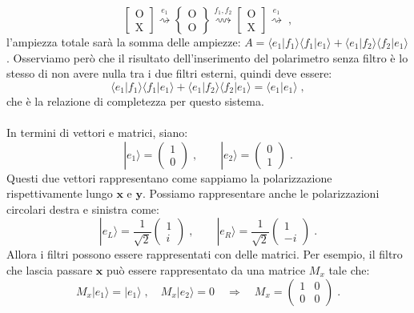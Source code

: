 \documentclass[12pt,a4paper]{report}
\theoremstyle{definition}
\numberwithin{equation}{section}
\newcommand{\bra}{\langle}
\newcommand{\ket}{\rangle}
\begin{document}
$$
\left[\begin{matrix}
\mathrm{O} \\
\mathrm{X}
\end{matrix}\right] \stackrel{e_1}{\rightsquigarrow}
\left\{\begin{matrix}
\mathrm{O} \\
\mathrm{O}
\end{matrix}\right\} \stackrel{f_1,f_2}{\rightsquigarrow}
\left[\begin{matrix}
\mathrm{O} \\
\mathrm{X}
\end{matrix}\right] \stackrel{e_1}{\rightsquigarrow}\;,
$$
l'ampiezza totale sarà la somma delle ampiezze: $A=\bra e_1|f_1\ket\bra f_1|e_1\ket+\bra e_1|f_2\ket\bra f_2|e_1\ket$. Osserviamo però che il risultato dell'inserimento del polarimetro senza filtro è lo stesso di non avere nulla tra i due filtri esterni, quindi deve essere:
$$
\bra e_1|f_1\ket\bra f_1|e_1\ket+\bra e_1|f_2\ket\bra f_2|e_1\ket=\bra e_1|e_1\ket\;,
$$
che è la relazione di completezza per questo sistema. \\
\\
In termini di vettori e matrici, siano:
$$
|e_1\ket=\left(
\begin{matrix}
1 \\
0
\end{matrix}\right)\;, \qquad
|e_2\ket=\left(
\begin{matrix}
0 \\
1
\end{matrix}\right)\;.
$$
Questi due vettori rappresentano come sappiamo la polarizzazione rispettivamente lungo $\mathbf{x}$ e $\mathbf{y}$. Possiamo rappresentare anche le polarizzazioni circolari destra e sinistra come:
$$
|e_L\ket=\frac{1}{\sqrt{2}}\left(
\begin{matrix}
1 \\
i
\end{matrix}\right)\;,\qquad
|e_R\ket=\frac{1}{\sqrt{2}}\left(
\begin{matrix}
1 \\
-i
\end{matrix}\right)\;.
$$
Allora i filtri possono essere rappresentati con delle matrici. Per esempio, il filtro che lascia passare $\mathbf{x}$ può essere rappresentato da una matrice $M_x$ tale che:
$$
M_x|e_1\ket=|e_1\ket\;,\quad M_x|e_2\ket=0 \quad \Longrightarrow\quad
M_x=\left(
\begin{matrix}
1 & 0 \\
0 & 0
\end{matrix}\right)\;.
$$
\end{document}
